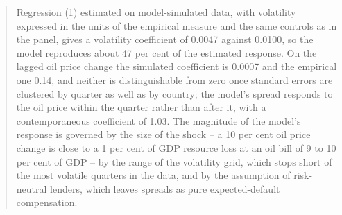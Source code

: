 \begin{quote}
Regression (1) estimated on model-simulated data, with volatility expressed in
the units of the empirical measure and the same controls as in the panel, gives
a volatility coefficient of 0.0047 against 0.0100, so the model reproduces about
47 per cent of the estimated response. On the lagged oil price change the
simulated coefficient is 0.0007 and the empirical one 0.14, and neither is
distinguishable from zero once standard errors are clustered by quarter as well
as by country; the model's spread responds to the oil price within the quarter
rather than after it, with a contemporaneous coefficient of 1.03. The magnitude
of the model's response is governed by the size of the shock -- a 10 per cent
oil price change is close to a 1 per cent of GDP resource loss at an oil bill of
9 to 10 per cent of GDP -- by the range of the volatility grid, which stops
short of the most volatile quarters in the data, and by the assumption of
risk-neutral lenders, which leaves spreads as pure expected-default
compensation.
\end{quote}
